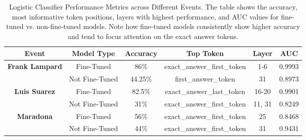 \documentclass{article}
\begin{document}
\begin{table}[t]
    \centering
    \renewcommand{\arraystretch}{1.2} %
    \begin{adjustbox}{width=0.95\textwidth} %
    \begin{tabular}{|c|c|c|c|c|c|}
        \hline
        \textbf{Event} & \textbf{Model Type} & \textbf{Accuracy} & \textbf{Top Token} & \textbf{Layer} & \textbf{AUC} \\
        \hline
        \multirow{2}{*}{\textbf{Frank Lampard}} & Fine-Tuned & 86\% & exact\_answer\_first\_token & 1-6 & 0.9993 \\
        & Not Fine-Tuned & 44.25\% & first\_answer\_token & 31 & 0.8973 \\
        \hline
        \multirow{2}{*}{\textbf{Luis Suarez}} & Fine-Tuned & 82.5\% & exact\_answer\_last\_token & 16-20 & 0.9901 \\
        & Not Fine-Tuned & 31\% & exact\_answer\_first\_token & 11, 31 & 0.8249 \\
        \hline
        \multirow{2}{*}{\textbf{Maradona}} & Fine-Tuned & 56\% & exact\_answer\_first\_token & 25 & 0.8468 \\
        & Not Fine-Tuned & 44\% & exact\_answer\_first\_token & 31 & 0.9431 \\
        \hline
    \end{tabular}
    \end{adjustbox}
    \caption{Logistic Classifier Performance Metrics across Different Events. The table shows the accuracy, most informative token positions, layers with highest performance, and AUC values for fine-tuned vs. non-fine-tuned models. Note how fine-tuned models consistently show higher accuracy and tend to focus attention on the exact answer tokens.}
    \label{tab:logistic_classifier}
\end{table}

\vspace{15mm} %
\end{document}
